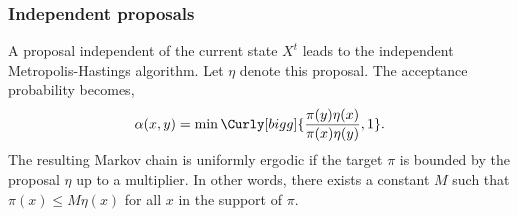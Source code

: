 \subsubsection{Independent proposals}
\label{ssub:Independent proposals}

A proposal independent of the current state $X^t$ leads to the independent
Metropolis-Hastings algorithm. Let $\eta$ denote this proposal. The acceptance
probability becomes,
\begin{equation}
  \alpha(x,y) = \min\Curly[bigg]{\frac{\pi(y)\eta(x)}{\pi(x)\eta(y)},1}.
\end{equation}
The resulting Markov chain is uniformly ergodic if the target $\pi$ is bounded
by the proposal $\eta$ up to a multiplier. In other words, there exists a
constant $M$ such that $\pi(x)\le M\eta(x)$ for all $x$ in the support of
$\pi$.


